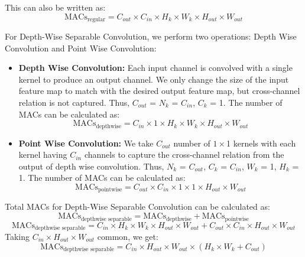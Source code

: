 \documentclass{article}
\begin{document}
This can also be written as:
\begin{equation}
    \text{MACs}_{\text{regular}} = C_{out} \times C_{in} \times H_k \times W_k \times H_{out} \times W_{out}
    \label{eq:macs-regular}
\end{equation}

For Depth-Wise Separable Convolution, we perform two operations: Depth Wise Convolution and Point Wise Convolution:

\begin{itemize}
    \item \textbf{Depth Wise Convolution:} Each input channel is convolved with a single kernel to produce an output channel. We only change the size of the input feature map to match with the desired output feature map, but cross-channel relation is not captured. Thus, $C_{out}$ = $N_k$ = $C_{in}$, $C_k$ = 1. The number of MACs can be calculated as:
    \begin{equation}
        \text{MACs}_{\text{depthwise}} = C_{in} \times 1 \times H_k \times W_k \times H_{out} \times W_{out}
    \end{equation} 
    \item \textbf{Point Wise Convolution:} We take $C_{out}$ number of $1 \times $1 kernels with each kernel having $C_{in}$ channels to capture the cross-channel relation from the output of depth wise convolution. Thus, $N_k$ = $C_{out}$, $C_k$ = $C_{in}$, $W_k$ = 1, $H_k$ = 1. The number of MACs can be calculated as:
    \begin{equation}
        \text{MACs}_{\text{pointwise}} = C_{out} \times C_{in} \times 1 \times 1 \times H_{out} \times W_{out}
    \end{equation}
\end{itemize}

Total MACs for Depth-Wise Separable Convolution can be calculated as:
\begin{equation}
    \text{MACs}_{\text{depthwise separable}} = \text{MACs}_{\text{depthwise}} + \text{MACs}_{\text{pointwise}}
\end{equation}
\begin{equation}
    \text{MACs}_{\text{depthwise separable}} = C_{in} \times H_k \times W_k \times H_{out} \times W_{out} + C_{out} \times C_{in} \times H_{out} \times W_{out}
\end{equation}
Taking $C_{in} \times H_{out} \times W_{out}$ common, we get:
\begin{equation}
    \text{MACs}_{\text{depthwise separable}} = C_{in} \times H_{out} \times W_{out} \times (H_k \times W_k + C_{out})
    \label{eq:macs-depthwise}
\end{equation}
\end{document}
